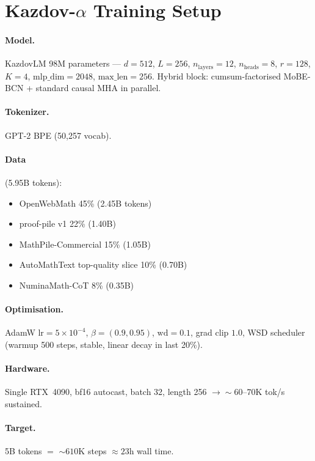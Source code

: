 \documentclass[11pt]{article}
\begin{document}
\section{Kazdov-$\alpha$ Training Setup}
\label{sec:setup}

\paragraph{Model.}
KazdovLM 98M parameters --- $d = 512$, $L = 256$, $n_{\mathrm{layers}} = 12$,
$n_{\mathrm{heads}} = 8$, $r = 128$, $K = 4$, $\text{mlp\_dim} = 2048$,
$\text{max\_len} = 256$. Hybrid block: cumsum-factorised MoBE-BCN +
standard causal MHA in parallel.

\paragraph{Tokenizer.} GPT-2 BPE (50{,}257 vocab).

\paragraph{Data} (5.95B tokens):
\begin{itemize}
\item OpenWebMath 45\% (2.45B tokens)
\item proof-pile v1 22\% (1.40B)
\item MathPile-Commercial 15\% (1.05B)
\item AutoMathText top-quality slice 10\% (0.70B)
\item NuminaMath-CoT 8\% (0.35B)
\end{itemize}

\paragraph{Optimisation.}
AdamW $\text{lr} = 5 \times 10^{-4}$, $\beta = (0.9, 0.95)$,
$\text{wd} = 0.1$, grad clip $1.0$, WSD scheduler (warmup 500 steps,
stable, linear decay in last 20\%).

\paragraph{Hardware.}
Single RTX~4090, bf16 autocast, batch 32, length 256
$\rightarrow \sim\!60$--$70$K tok/s sustained.

\paragraph{Target.}
5B tokens $=$ $\sim\!610$K steps $\approx\!23$h wall time.
\end{document}
